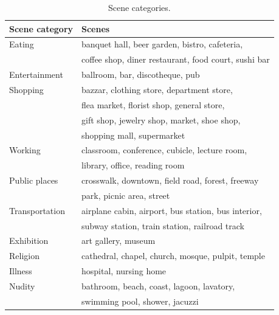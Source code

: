 \begin{table}[tb]
\centering
\caption{Scene categories.}
\label{tbl-scenecate}
\begin{tabular}{ll}
\toprule
Scene category & Scenes                                                  \\ \midrule
Eating         & banquet hall, beer garden, bistro, cafeteria,       \\
               & coffee shop, diner restaurant, food court, sushi bar  \\ \midrule
Entertainment  & ballroom, bar, discotheque, pub                         \\ \midrule
Shopping       & bazzar, clothing store, department store,             \\
               & flea market, florist shop, general store,            \\
               & gift shop, jewelry shop, market, shoe shop,              \\
               & shopping mall, supermarket                           \\ \midrule
Working        & classroom, conference, cubicle, lecture room,           \\
               & library, office, reading room                        \\ \midrule
Public places  & crosswalk, downtown, field road, forest, freeway       \\
               & park, picnic area, street                            \\ \midrule
Transportation & airplane cabin, airport, bus station, bus interior,   \\
               & subway station, train station, railroad track         \\ \midrule
Exhibition     & art gallery, museum                                  \\ \midrule
Religion       & cathedral, chapel, church, mosque, pulpit, temple     \\ \midrule
Illness        & hospital, nursing home                               \\ \midrule
Nudity         & bathroom, beach, coast, lagoon, lavatory,            \\
               & swimming pool, shower, jacuzzi                       \\ \bottomrule
\end{tabular}
\end{table}




